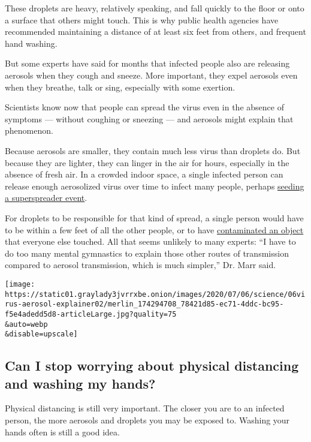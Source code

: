 These droplets are heavy, relatively speaking, and fall quickly to the
floor or onto a surface that others might touch. This is why public
health agencies have recommended maintaining a distance of at least six
feet from others, and frequent hand washing.

But some experts have said for months that infected people also are
releasing aerosols when they cough and sneeze. More important, they
expel aerosols even when they breathe, talk or sing, especially with
some exertion.

Scientists know now that people can spread the virus even in the absence
of symptoms --- without coughing or sneezing --- and aerosols might
explain that phenomenon.

Because aerosols are smaller, they contain much less virus than droplets
do. But because they are lighter, they can linger in the air for hours,
especially in the absence of fresh air. In a crowded indoor space, a
single infected person can release enough aerosolized virus over time to
infect many people, perhaps
\href{https://www.nytimes3xbfgragh.onion/2020/06/30/science/how-coronavirus-spreads.html}{seeding
a superspreader event}.

For droplets to be responsible for that kind of spread, a single person
would have to be within a few feet of all the other people, or to have
\href{https://www.nytimes3xbfgragh.onion/2020/05/28/well/live/whats-the-risk-of-catching-coronavirus-from-a-surface.html}{contaminated
an object} that everyone else touched. All that seems unlikely to many
experts: ``I have to do too many mental gymnastics to explain those
other routes of transmission compared to aerosol transmission, which is
much simpler,'' Dr. Marr said.

\texttt{[image: https://static01.graylady3jvrrxbe.onion/images/2020/07/06/science/06virus-aerosol-explainer02/merlin\_174294708\_78421d85-ec71-4ddc-bc95-f5e4adedd5d8-articleLarge.jpg?quality=75\\\&auto=webp\\\&disable=upscale]}

\hypertarget{can-i-stop-worrying-about-physical-distancing-and-washing-my-hands}{%
\subsection{Can I stop worrying about physical distancing and washing my
hands?}\label{can-i-stop-worrying-about-physical-distancing-and-washing-my-hands}}

Physical distancing is still very important. The closer you are to an
infected person, the more aerosols and droplets you may be exposed to.
Washing your hands often is still a good idea.

